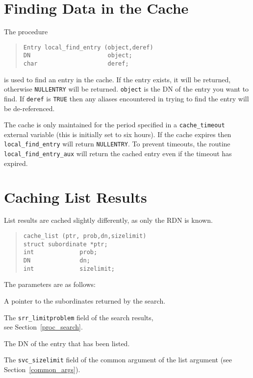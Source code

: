 \section{Finding Data in the Cache}

The procedure 
\begin{quote}\small\begin{verbatim}
Entry local_find_entry (object,deref)
DN                      object;
char                    deref;
\end{verbatim}\end{quote}
is used to find an entry in the cache.
If the entry exists, it will be returned, otherwise \verb"NULLENTRY"
will be returned.
\verb"object" is the DN of the entry you want to find.
If \verb"deref" is \verb"TRUE" then any aliases encountered in trying 
to find the entry will be de-referenced.

The cache is only maintained for the period specified in a
\verb+cache_timeout+ external variable (this is initially set to six hours).
If the cache expires then 
\verb+local_find_entry+
will return \verb"NULLENTRY".
To prevent timeouts, the routine
\verb+local_find_entry_aux+ will return 
the cached entry even if the timeout has expired.

\section {Caching List Results}
List results are cached slightly differently, as only the RDN is known.
\begin{quote}\small\begin{verbatim}
cache_list (ptr, prob,dn,sizelimit)
struct subordinate *ptr;
int             prob;
DN              dn;
int             sizelimit;
\end{verbatim}\end{quote}
The parameters are as follows:
\begin{describe}
\item [\verb"ptr":] A pointer to the subordinates returned by the search.
\item [\verb"prob":] The \verb"srr_limitproblem" field of the search
results,\\ see
Section~\ref{proc_search}.
\item [\verb"dn":] The DN of the entry that has been listed.
\item [\verb"ptr":] The \verb"svc_sizelimit" field of the common argument of
the list argument (see Section~\ref{common_args}).
\end{describe}


